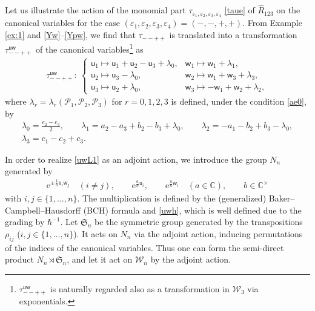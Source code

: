 \documentclass[pdftex]{sigma}
\newcommand{\C}{{\mathbb C}}
\newcommand{\e}{{\mathrm e}}
\newcommand{\uu}{{\mathsf u}}
\newcommand{\ww}{{\mathsf w}}
\numberwithin{equation}{section}
\begin{document}
Let us illustrate the action of the monomial part
$\tau_{\varepsilon_1, \varepsilon_2, \varepsilon_3, \varepsilon_4}$
 \eqref{taue} of $\widehat{R}_{123}$ on the canonical variables for the case
 $(\varepsilon_1, \varepsilon_2, \varepsilon_3, \varepsilon_4) = (-,-,+,+)$.
 From Example \ref{ex:1} and \eqref{Yw}--\eqref{Ypw}, we find that
$\tau_{--++}$ is translated into a transformation $\tau^{\uu\ww}_{--++}$
of the canonical variables\footnote{$\tau^{\uu\ww}_{--++}$ is naturally regarded also as
a transformation in $\mathcal{W}_3$ via exponentials.} as
\begin{align}
\tau^{\uu\ww}_{--++}\colon\
\begin{cases}
\uu_1 \mapsto \uu_1+\uu_2-\uu_3+\lambda_0,
&
\ww_1 \mapsto \ww_1+ \lambda_1,
\\
\uu_2 \mapsto \uu_3-\lambda_0,
&
\ww_2 \mapsto \ww_1+\ww_3+\lambda_3,
\\
\uu_3 \mapsto \uu_2+\lambda_0,
&
\ww_3 \mapsto -\ww_1+\ww_2+\lambda_2,
\end{cases}
\label{uwL1}
\end{align}
where $\lambda_r=\lambda_r(\mathscr{P}_1,\mathscr{P}_2,\mathscr{P}_3)$
for $r=0, 1, 2, 3$ is defined, under the condition \eqref{ae0},
by
\begin{gather}
\lambda_0 = \frac{e_2-e_3}{2},\qquad
\lambda_1 = a_2-a_3+b_2-b_3 + \lambda_0,\qquad
\lambda_2 = -a_1-b_2+b_3-\lambda_0,\nonumber\\
\lambda_3 = c_1-c_2+c_3.\label{lad}
\end{gather}

In order to realize \eqref{uwL1} as an adjoint action, we introduce
the group $N_n$ generated by
\begin{gather*}
\e^{\pm \tfrac{1}{\hbar}\uu_i\ww_j}\quad (i \neq j),\qquad
\e^{ \tfrac{a}{\hbar}\uu_i}, \qquad \e^{ \tfrac{a}{\hbar}\ww_i}  \quad (a \in \C) ,\qquad b \in \C^\times
\end{gather*}
with $i, j\in \{1,\dotsc, n\}$. The multiplication is defined by
the (generalized) Baker--Campbell--Hausdorff (BCH) formula and
\eqref{uwh}, which is well defined due to the grading by $\hbar^{-1}$.
Let $\mathfrak{S}_n$ be the symmetric group generated by the
transpositions $\rho_{ij}$ ($i, j \in \{1,\dotsc, n\}$). It acts on
$N_n$ via the adjoint action, inducing permutations of the indices of
the canonical variables. Thus one can form the semi-direct product
$N_n \rtimes \mathfrak{S}_n$, and let it act on $\mathcal{W}_n$ by the
adjoint action.
\end{document}
